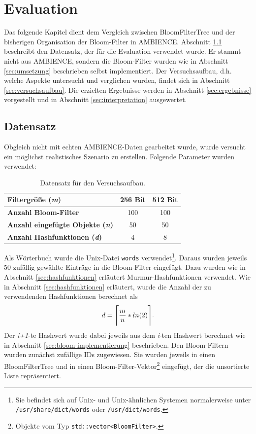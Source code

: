 \chapter{Evaluation}\label{ch:evaluation}
Das folgende Kapitel dient dem Vergleich zwischen BloomFilterTree und der bisherigen Organisation der Bloom-Filter in AMBIENCE. Abschnitt \ref{sec:datensatz} beschreibt den Datensatz, der für die Evaluation verwendet wurde. Er stammt nicht aus AMBIENCE, sondern die Bloom-Filter wurden wie in Abschnitt \ref{sec:umsetzung} beschrieben selbst implementiert. Der Versuchsaufbau, d.h. welche Aspekte untersucht und verglichen wurden, findet sich in Abschnitt \ref{sec:versuchsaufbau}. Die erzielten Ergebnisse werden in Abschnitt \ref{sec:ergebnisse} vorgestellt und in Abschnitt \ref{sec:interpretation} ausgewertet.
\section{Datensatz}\label{sec:datensatz}
Obgleich nicht mit echten AMBIENCE-Daten gearbeitet wurde, wurde versucht ein möglichst realistisches Szenario zu erstellen. Folgende Parameter wurden verwendet:
\begin{center}
\begin{table}[htbp]
{\small
\begin{center}
\begin{tabular}[center]{lcc}
\toprule
\textbf{Filtergröße (\textit{m})} & 256 Bit & 512 Bit\\
\midrule
\textbf{Anzahl Bloom-Filter} & 100 & 100\\
\midrule
\textbf{Anzahl eingefügte Objekte (\textit{n})} & 50 & 50\\
\midrule
\textbf{Anzahl Hashfunktionen (\textit{d})} & 4 & 8\\
\bottomrule
\end{tabular}
\end{center}
} %
\caption[Datensatz für den Versuchsaufbau]{Datensatz für den Versuchsaufbau.\label{tab:Datensatz}}
\end{table}
\end{center}
Als Wörterbuch wurde die Unix-Datei \texttt{words} verwendet\footnote{Sie befindet sich auf Unix- und Unix-ähnlichen Systemen normalerweise unter \texttt{/usr/share/dict/words} oder \texttt{/usr/dict/words}.}. Daraus wurden jeweils 50 zufällig gewählte Einträge in die Bloom-Filter eingefügt. Dazu wurden wie in Abschnitt \ref{sec:hashfunktionen} erläutert Murmur-Hashfunktionen verwendet. Wie in Abschnitt \ref{sec:hashfunktionen} erläutert, wurde die Anzahl der zu verwendenden Hashfunktionen berechnet als 
\[d = \Ceil[\Bigg]{\frac{m}{n} * ln(2)}.\]
\noindent
Der \textit{i+1}-te Hashwert wurde dabei jeweils aus dem \textit{i}-ten Hashwert berechnet wie in Abschnitt \ref{sec:bloom-implementierung} beschrieben. Den Bloom-Filtern wurden zunächst zufällige IDs zugewiesen. Sie wurden jeweils in einen BloomFilterTree und in einen Bloom-Filter-Vektor\footnote{Objekte vom Typ \texttt{std::vector<BloomFilter>}.} eingefügt, der die unsortierte Liste repräsentiert.
\newpage
